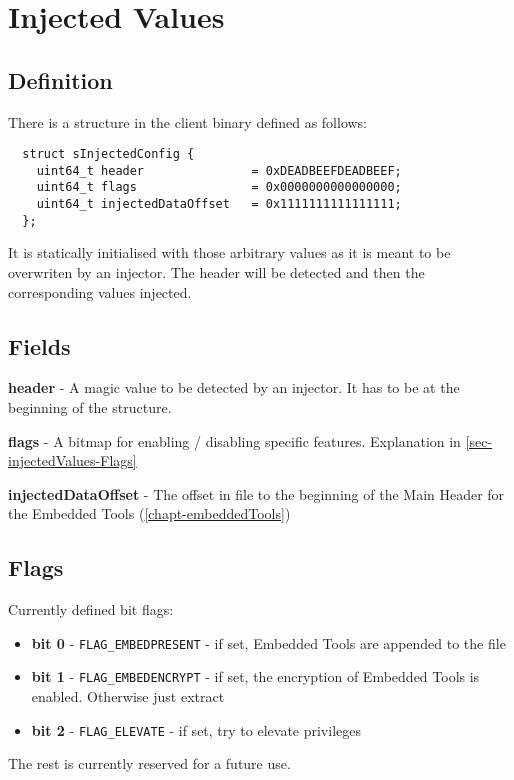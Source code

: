 \chapter{Injected Values}
\label{chapt-injectedValues}

\section{Definition}

There is a structure in the client binary defined as follows:

\begin{lstlisting}
  struct sInjectedConfig {
    uint64_t header               = 0xDEADBEEFDEADBEEF;
    uint64_t flags                = 0x0000000000000000;
    uint64_t injectedDataOffset   = 0x1111111111111111;
  };
\end{lstlisting}

It is statically initialised with those arbitrary values as it is meant to be overwriten by an injector. The header will be detected and then the corresponding values injected.

\section{Fields}

\textbf{header} - A magic value to be detected by an injector. It has to be at the beginning of the structure.

\textbf{flags} - A bitmap for enabling / disabling specific features. Explanation in \autoref{sec-injectedValues-Flags}

\textbf{injectedDataOffset} - The offset in file to the beginning of the Main Header for the Embedded Tools (\autoref{chapt-embeddedTools})

\section{Flags}
\label{sec-injectedValues-Flags}
Currently defined bit flags:
\begin{itemize}
  \item \textbf{bit 0} - \verb|FLAG_EMBEDPRESENT| - if set, Embedded Tools are appended to the file
  \item \textbf{bit 1} - \verb|FLAG_EMBEDENCRYPT| - if set, the encryption of Embedded Tools is enabled. Otherwise just extract
  \item \textbf{bit 2} - \verb|FLAG_ELEVATE| - if set, try to elevate privileges
\end{itemize}

The rest is currently reserved for a future use.